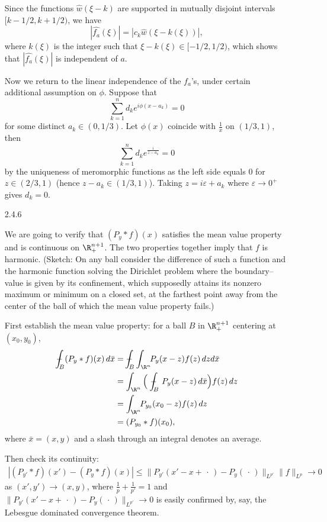 \begin{itemize}
Since the functions $\widehat{w}(\xi-k)$ are supported in 
mutually disjoint intervals $[k-1/2,k+1/2)$, we have
$$|\widehat{f_a}(\xi)|=|c_k\widehat{w}(\xi-k(\xi))|,$$
where $k(\xi)$ is the integer such that $\xi-k(\xi)\in [-1/2,1/2)$, 
which shows that $|\widehat{f_a}(\xi)|$ is independent of $a$.

Now we return to the linear independence of the $f_a$'s, 
under certain additional assumption on $\phi$. Suppose that
$$\sum_{k=1}^nd_ke^{i\phi(x-a_k)}=0$$
for some distinct $a_k\in(0,1/3)$. Let $\phi(x)$ coincide with $\frac{1}{x}$ on $(1/3,1)$, then
$$\sum_{k=1}^nd_ke^{\frac{i}{z-a_k}}=0$$
by the uniqueness of meromorphic functions 
as the left side equals $0$ for $z\in(2/3,1)$ (hence $z-a_k\in(1/3,1)$). 
Taking $z=i\varepsilon+a_k$ where $\varepsilon\rightarrow0^+$ gives $d_k=0$.

\item[2.4.6]

We are going to verify that $(P_y*f)(x)$ satisfies the mean value property 
and is continuous on $\R_+^{n+1}$. 
The two properties together imply that $f$ is harmonic.
(Sketch: On any ball consider the difference of such a function 
and the harmonic function solving the Dirichlet problem 
where the boundary--value is given by its confinement, 
which supposedly attains its nonzero maximum or minimum on a closed set, 
at the farthest point away from the center of the ball of which 
the mean value property fails.)
\newcommand\tbbint{{-\mkern -16mu\int}}
\newcommand\dbbint{{-\mkern -19mu\int}}
\newcommand\intbar{{\mathchoice{\dbbint}{\tbbint}{\tbbint}{\tbbint}}}

First establish the mean value property: 
for a ball $B$ in $\R_+^{n+1}$ centering at $(x_0,y_0)$,
\begin{align*}
    \intbar_{\!\!\!\!B} (P_y*f)(x)\,d\bar{x}
    &=\intbar_{\!\!\!\!B}\int_{\R^n}\!\!P_y(x-z)f(z)\,dzd\bar{x}\\
    &=\int_{\R^n}\Big(\ \intbar_{\!\!\!\!B}\ P_y(x-z)\,d\bar{x}\Big)f(z)\,dz\\
    &=\int_{\R^n}\!\!P_{y_0}(x_0-z)f(z)\,dz\\
    &=(P_{y_0}*f)(x_0),
\end{align*}
where $\bar{x}=(x,y)$ and a slash through an integral denotes an average.

Then check its continuity:
\begin{align*}
    |(P_{y'}*f)(x')-(P_y*f)(x)|
    \leq\|P_{y'}(x'-x+\,\cdot\,)-P_y(\,\cdot\,)\|_{L^{p'}}\|f\|_{L^p}
    \rightarrow0
\end{align*}
as $(x',y')\rightarrow(x,y)$, where $\frac{1}{p}+\frac{1}{p'}=1$ and 
$\|P_{y'}(x'-x+\,\cdot\,)-P_y(\,\cdot\,)\|_{L^{p'}}\rightarrow0$ 
is easily confirmed by, say, the Lebesgue dominated convergence theorem.


\end{itemize}
